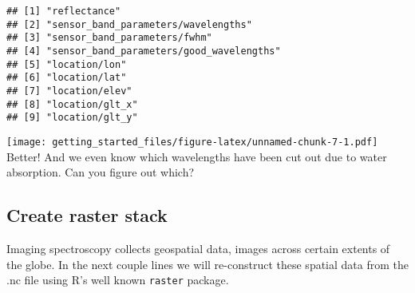 \documentclass[
]{article}
\newenvironment{Shaded}{\begin{snugshade}}{\end{snugshade}}
\newcommand{\AttributeTok}[1]{\textcolor[rgb]{0.13,0.29,0.53}{#1}}
\newcommand{\FunctionTok}[1]{\textcolor[rgb]{0.13,0.29,0.53}{\textbf{#1}}}
\newcommand{\NormalTok}[1]{#1}
\newcommand{\OtherTok}[1]{\textcolor[rgb]{0.56,0.35,0.01}{#1}}
\newcommand{\SpecialCharTok}[1]{\textcolor[rgb]{0.81,0.36,0.00}{\textbf{#1}}}
\newcommand{\StringTok}[1]{\textcolor[rgb]{0.31,0.60,0.02}{#1}}
\begin{document}
\begin{Shaded}
\end{Shaded}

\begin{verbatim}
## [1] "reflectance"                            
## [2] "sensor_band_parameters/wavelengths"     
## [3] "sensor_band_parameters/fwhm"            
## [4] "sensor_band_parameters/good_wavelengths"
## [5] "location/lon"                           
## [6] "location/lat"                           
## [7] "location/elev"                          
## [8] "location/glt_x"                         
## [9] "location/glt_y"
\end{verbatim}

\begin{Shaded}
\end{Shaded}

\texttt{[image: getting\_started\_files/figure-latex/unnamed-chunk-7-1.pdf]}
Better! And we even know which wavelengths have been cut out due to
water absorption. Can you figure out which?

\hypertarget{create-raster-stack}{%
\subsection{Create raster stack}\label{create-raster-stack}}

Imaging spectroscopy collects geospatial data, images across certain
extents of the globe. In the next couple lines we will re-construct
these spatial data from the .nc file using R's well known
\texttt{raster} package.
\end{document}
